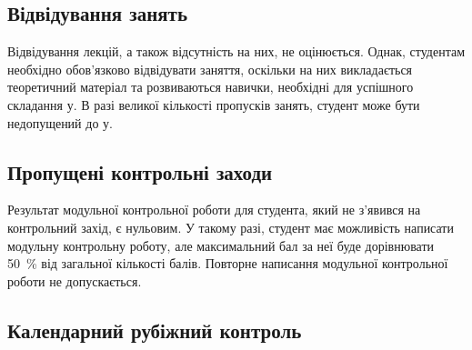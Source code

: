 \documentclass{Syllabus}
\begin{document}

\subsection*{Відвідування занять}
Відвідування лекцій, а також відсутність на них, не оцінюється. Однак, студентам необхідно обов'язково відвідувати заняття, оскільки на них викладається теоретичний матеріал та розвиваються навички, необхідні для успішного складання \control у. В разі великої кількості пропусків занять, студент може бути недопущений до \control у.

\subsection*{Пропущені контрольні заходи}

Результат модульної контрольної роботи для студента, який не з’явився на контрольний захід, є нульовим. У такому разі, студент має можливість написати модульну контрольну роботу, але максимальний бал за неї буде дорівнювати 50~\% від загальної кількості балів. Повторне написання модульної контрольної роботи не допускається.

\subsection*{Календарний рубіжний контроль}
\end{document}
